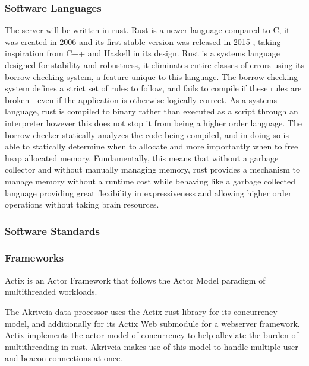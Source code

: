 \subsubsection{Software Languages}
The server will be written in rust.
Rust is a newer language compared to C, it was created in 2006 \cite{rust_graydon_interview} and its first stable version was released in 2015 \cite{rust_releases}, taking inspiration from C++ and Haskell in its design.
Rust is a systems language designed for stability and robustness, it eliminates entire classes of errors using its borrow checking system, a feature unique to this language.
The borrow checking system defines a strict set of rules to follow, and fails to compile if these rules are broken - even if the application is otherwise logically correct.
As a systems language, rust is compiled to binary rather than executed as a script through an interpreter however this does not stop it from being a higher order language.
The borrow checker statically analyzes the code being compiled, and in doing so is able to statically determine when to allocate and more importantly when to free heap allocated memory.
Fundamentally, this means that without a garbage collector and without manually managing memory, rust provides a mechanism to manage memory without a runtime cost while behaving like a garbage collected language providing great flexibility in expressiveness and allowing higher order operations without taking brain resources.


\bigskip
\subsubsection{Software Standards}



\subsubsection{Frameworks}
Actix is an Actor Framework that follows the Actor Model paradigm of multithreaded workloads.

The Akriveia data processor uses the Actix rust library for its concurrency model, and additionally for its Actix Web submodule for a webserver framework.
Actix implements the actor model of concurrency to help alleviate the burden of multithreading in rust.
Akriveia makes use of this model to handle multiple user and beacon connections at once.

